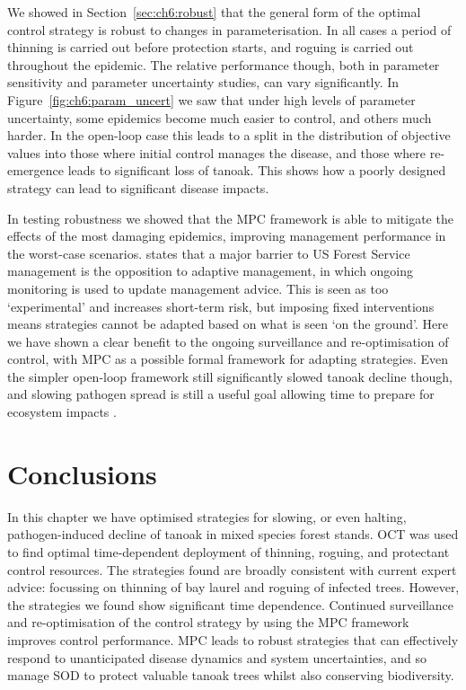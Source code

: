 We showed in Section~\ref{sec:ch6:robust} that the general form of the optimal control strategy is robust to changes in parameterisation. In all cases a period of thinning is carried out before protection starts, and roguing is carried out throughout the epidemic. The relative performance though, both in parameter sensitivity and parameter uncertainty studies, can vary significantly. In Figure~\ref{fig:ch6:param_uncert} we saw that under high levels of parameter uncertainty, some epidemics become much easier to control, and others much harder. In the open-loop case this leads to a split in the distribution of objective values into those where initial control manages the disease, and those where re-emergence leads to significant loss of tanoak. This shows how a poorly designed strategy can lead to significant disease impacts.

In testing robustness we showed that the MPC framework is able to mitigate the effects of the most damaging epidemics, improving management performance in the worst-case scenarios. \citet{maccleery_reinventing_2015} states that a major barrier to US Forest Service management is the opposition to adaptive management, in which ongoing monitoring is used to update management advice. This is seen as too `experimental' and increases short-term risk, but imposing fixed interventions means strategies cannot be adapted based on what is seen `on the ground'. Here we have shown a clear benefit to the ongoing surveillance and re-optimisation of control, with MPC as a possible formal framework for adapting strategies. Even the simpler open-loop framework still significantly slowed tanoak decline though, and slowing pathogen spread is still a useful goal allowing time to prepare for ecosystem impacts \citep{cobb_biodiversity_2013}.


\section{Conclusions\label{sec:ch6:conclusions}}

In this chapter we have optimised strategies for slowing, or even halting, pathogen-induced decline of tanoak in mixed species forest stands. OCT was used to find optimal time-dependent deployment of thinning, roguing, and protectant control resources. The strategies found are broadly consistent with current expert advice: focussing on thinning of bay laurel and roguing of infected trees. However, the strategies we found show significant time dependence. Continued surveillance and re-optimisation of the control strategy by using the MPC framework improves control performance. MPC leads to robust strategies that can effectively respond to unanticipated disease dynamics and system uncertainties, and so manage SOD to protect valuable tanoak trees whilst also conserving biodiversity.
